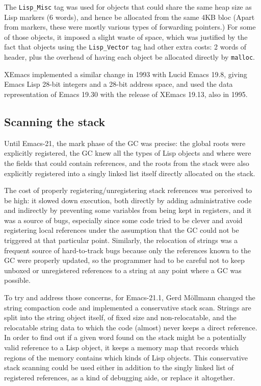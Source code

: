 \documentclass[format=acmsmall, review]{acmart}
\newcommand \Elisp {Emacs Lisp}
\begin{document}
The \texttt{Lisp\_Misc} tag was used for objects that could share the same
heap size as Lisp markers (6 words), and hence be allocated from the same
4KB bloc  (Apart from markers, these were mostly various types of
forwarding pointers.)  For some of those objects, it imposed a slight waste of space,
which was justified by the fact that objects using the \texttt{Lisp\_Vector}
tag had other extra costs: 2 words of header, plus the overhead of having
each object be allocated directly by \texttt{malloc}.

XEmacs implemented a similar change in 1993 with Lucid Emacs 19.8,
giving \Elisp{} 28-bit integers and a 28-bit address space, and
used the data representation of Emacs 19.30 with the release of XEmacs 19.13, also in
1995.


\subsection{Scanning the stack}
\label{sec:stack-scanning}

Until Emacs-21, the mark phase of the GC was precise: the global roots were
explicitly registered, the GC knew all the types of Lisp objects and where
were the fields that could contain references, and the roots from the stack
were also explicitly registered into a singly linked list itself directly
allocated on the stack.

The cost of properly registering/unregistering stack references was
perceived to be high: it slowed down execution, both directly by adding
administrative code and indirectly by preventing some variables from being
kept in registers, and it was a source of bugs, especially since some code
tried to be clever and avoid registering local references under the
assumption that the GC could not be triggered at that particular point.
Similarly, the relocation of strings was a frequent source of hard-to-track
bugs because only the references known to the GC were properly updated, so
the programmer had to be careful not to keep unboxed or unregistered
references to a string at any point where a GC was possible.

To try and address those concerns, for Emacs-21.1, Gerd Möllmann changed the
string compaction code and implemented a conservative stack scan.
Strings are split into the string object itself, of fixed size and
non-relocatable, and the relocatable string data to which the code (almost)
never keeps a direct reference.  In order to find out if a given word found
on the stack might be a potentially valid reference to a Lisp object, it
keeps a memory map that records which regions of the memory contains which
kinds of Lisp objects.  This conservative stack scanning could be used
either in addition to the singly linked list of registered references, as
a kind of debugging aide, or replace it altogether.
\end{document}
